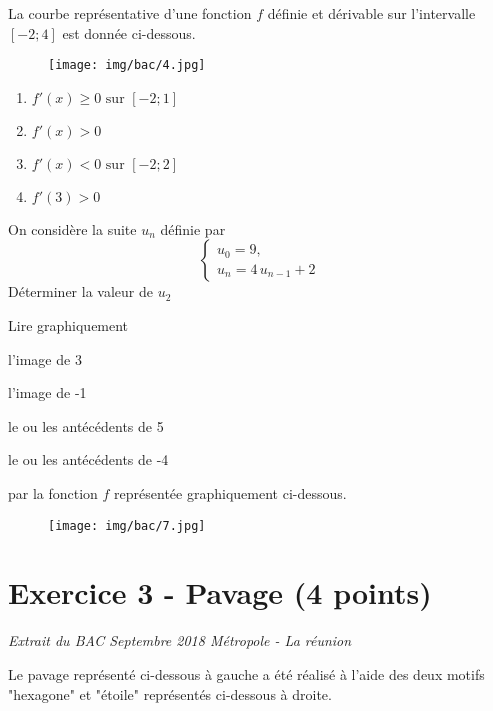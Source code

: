 \documentclass[answers]{exam}
\begin{document}
\begin{questions}
  \question[1] La courbe représentative d’une fonction $f$ définie et dérivable sur l’intervalle $[-2;4]$ est donnée ci-dessous.

\begin{figure}[H]
  \centering
  \texttt{[image: img/bac/4.jpg]}
\end{figure}

\begin{enumerate}
  \item $f'(x) \ge 0 \text{ sur } [-2;1]$
  \item $f'(x) > 0$
  \item $f'(x) < 0 \text{ sur } [-2;2]$
  \item $f'(3) > 0$
\end{enumerate}

  \question[1] On considère la suite $u_n$ définie par
  \[
    \begin{cases}
      u_0 = 9, \\[4pt]
      u_n = 4\,u_{n-1} + 2 
    \end{cases}
  \]
  Déterminer la valeur de $u_2$

\question[1] Lire graphiquement
\begin{compactenum}
\item l'image de 3
\item l'image de -1
\item le ou les antécédents de 5
\item le ou les antécédents de -4
\end{compactenum}
par la fonction $f$ représentée graphiquement ci-dessous.

\begin{figure}[H]
  \centering
  \texttt{[image: img/bac/7.jpg]}
\end{figure}

\end{questions}

\section*{Exercice 3 - Pavage (4 points)}

\textit{Extrait du BAC Septembre 2018 Métropole - La réunion}

\vspace{1em}

Le pavage représenté ci-dessous à gauche a été réalisé à l’aide des deux motifs "hexagone" et "étoile" représentés ci-dessous à droite.
\end{document}
